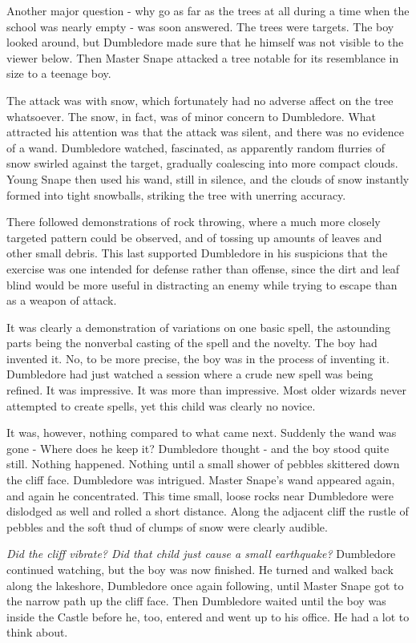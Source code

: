 \documentclass[a4paper,11pt]{article}
\begin{document}
Another major question - why go as far as the trees at all during a time when the school was nearly empty - was soon answered. The trees were targets. The boy looked around, but Dumbledore made sure that he himself was not visible to the viewer below. Then Master Snape attacked a tree notable for its resemblance in size to a teenage boy.

The attack was with snow, which fortunately had no adverse affect on the tree whatsoever. The snow, in fact, was of minor concern to Dumbledore. What attracted his attention was that the attack was silent, and there was no evidence of a wand. Dumbledore watched, fascinated, as apparently random flurries of snow swirled against the target, gradually coalescing into more compact clouds. Young Snape then used his wand, still in silence, and the clouds of snow instantly formed into tight snowballs, striking the tree with unerring accuracy.

There followed demonstrations of rock throwing, where a much more closely targeted pattern could be observed, and of tossing up amounts of leaves and other small debris. This last supported Dumbledore in his suspicions that the exercise was one intended for defense rather than offense, since the dirt and leaf blind would be more useful in distracting an enemy while trying to escape than as a weapon of attack.

It was clearly a demonstration of variations on one basic spell, the astounding parts being the nonverbal casting of the spell and the novelty. The boy had invented it. No, to be more precise, the boy was in the process of inventing it. Dumbledore had just watched a session where a crude new spell was being refined. It was impressive. It was more than impressive. Most older wizards never attempted to create spells, yet this child was clearly no novice.

It was, however, nothing compared to what came next. Suddenly the wand was gone - Where does he keep it? Dumbledore thought - and the boy stood quite still. Nothing happened. Nothing until a small shower of pebbles skittered down the cliff face. Dumbledore was intrigued. Master Snape's wand appeared again, and again he concentrated. This time small, loose rocks near Dumbledore were dislodged as well and rolled a short distance. Along the adjacent cliff the rustle of pebbles and the soft thud of clumps of snow were clearly audible.

\emph{Did the cliff vibrate? Did that child just cause a small earthquake?} Dumbledore continued watching, but the boy was now finished. He turned and walked back along the lakeshore, Dumbledore once again following, until Master Snape got to the narrow path up the cliff face. Then Dumbledore waited until the boy was inside the Castle before he, too, entered and went up to his office. He had a lot to think about.
\end{document}
